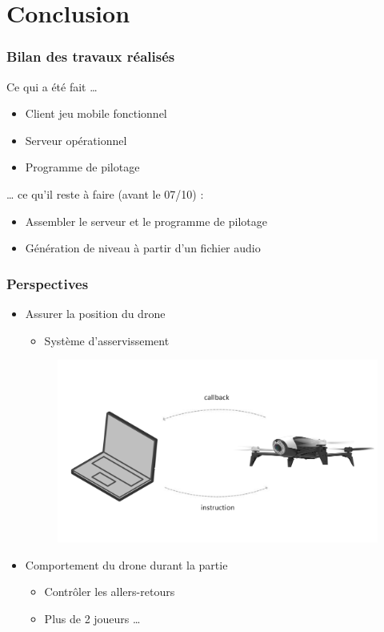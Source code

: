 \section{Conclusion}
\begin{frame}
\frametitle{Bilan des travaux réalisés}
\begin{exampleblock}{Ce qui a été fait \dots}
\begin{itemize}
\item Client jeu mobile fonctionnel
\item Serveur opérationnel
\item Programme de pilotage
\end{itemize}
\end{exampleblock}
\begin{block}{\dots{} ce qu'il reste à faire (avant le 07/10) :}
\begin{itemize}
\item Assembler le serveur et le programme de pilotage
\item Génération de niveau à partir d'un fichier audio
\end{itemize}
\end{block}
\end{frame}

\begin{frame}
\frametitle{Perspectives}
\begin{center}
\begin{itemize}
\item Assurer la position du drone 
\begin{itemize}
\item Système d'asservissement
\end{itemize}
\begin{figure}
\includegraphics[scale=0.06]{images/callback.jpg}
\end{figure}
\item Comportement du drone durant la partie
\begin{itemize}
\item Contrôler les allers-retours
\item Plus de 2 joueurs \dots
\end{itemize}
\end{itemize}
\end{center}
\end{frame}